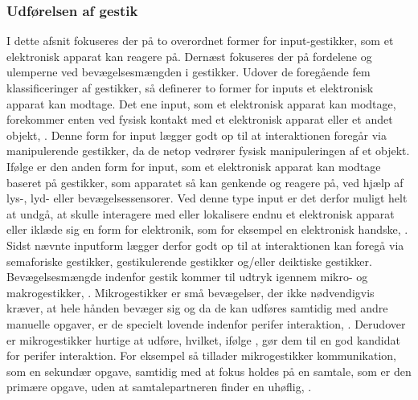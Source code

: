 \subsubsection{Udførelsen af gestik}
\label{UdfoerelseAfGestik}
%
I dette afsnit fokuseres der på to overordnet former for input-gestikker, som et elektronisk apparat kan reagere på. Dernæst fokuseres der på fordelene og ulemperne ved bevægelsesmængden i gestikker.\blankline
%
Udover de foregående fem klassificeringer af gestikker, så definerer \textcite[s. 9]{PDF:ATaxonomyOfGestures} to former for inputs et elektronisk apparat kan modtage. Det ene input, som et elektronisk apparat kan modtage, forekommer enten ved fysisk kontakt med et elektronisk apparat eller et andet objekt, \parencite[s. 10]{PDF:ATaxonomyOfGestures}. Denne form for input lægger godt op til at interaktionen foregår via manipulerende gestikker, da de netop vedrører fysisk manipuleringen af et objekt. Ifølge \textcite[s. 12]{PDF:ATaxonomyOfGestures} er den anden form for input, som et elektronisk apparat kan modtage baseret på gestikker, som apparatet så kan genkende og reagere på, ved hjælp af lys-, lyd- eller bevægelsessensorer. Ved denne type input er det derfor muligt helt at undgå, at skulle interagere med eller lokalisere endnu et elektronisk apparat eller iklæde sig en form for elektronik, som for eksempel en elektronisk handske, \parencite[s. 12]{PDF:ATaxonomyOfGestures}. Sidst nævnte inputform lægger derfor godt op til at interaktionen kan foregå via semaforiske gestikker, gestikulerende gestikker og/eller deiktiske gestikker. \blankline
%
Bevægelsesmængde indenfor gestik kommer til udtryk igennem mikro- og makrogestikker, \parencite[s. 6]{PDF:UsabilityofMicroVsMacroGestures}. Mikrogestikker er små bevægelser, der ikke nødvendigvis kræver, at hele hånden bevæger sig og da de kan udføres samtidig med andre manuelle opgaver, er de specielt lovende indenfor perifer interaktion, \parencite[s. 95]{PDF:PIMicrogesturesKap5}. Derudover er mikrogestikker hurtige at udføre, hvilket, ifølge \textcite[s. 96]{PDF:PIMicrogesturesKap5}, gør dem til en god kandidat for perifer interaktion. For eksempel så tillader mikrogestikker kommunikation, som en sekundær opgave, samtidig med at fokus holdes på en samtale, som er den primære opgave, uden at samtalepartneren finder en uhøflig, \parencite[s. 97]{PDF:PIMicrogesturesKap5}.

